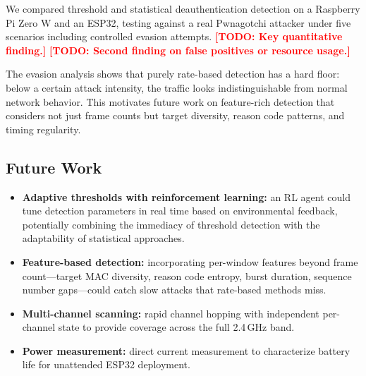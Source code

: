 \documentclass[conference]{IEEEtran}
\newcommand{\placeholder}[1]{\textcolor{red}{\textbf{[TODO: #1]}}}
\begin{document}
We compared threshold and statistical deauthentication detection on a Raspberry Pi Zero W and an ESP32, testing against a real Pwnagotchi attacker under five scenarios including controlled evasion attempts. \placeholder{Key quantitative finding.} \placeholder{Second finding on false positives or resource usage.}

The evasion analysis shows that purely rate-based detection has a hard floor: below a certain attack intensity, the traffic looks indistinguishable from normal network behavior. This motivates future work on feature-rich detection that considers not just frame counts but target diversity, reason code patterns, and timing regularity.

\subsection{Future Work}

\begin{itemize}
    \item \textbf{Adaptive thresholds with reinforcement learning:} an RL agent could tune detection parameters in real time based on environmental feedback, potentially combining the immediacy of threshold detection with the adaptability of statistical approaches.
    \item \textbf{Feature-based detection:} incorporating per-window features beyond frame count---target MAC diversity, reason code entropy, burst duration, sequence number gaps---could catch slow attacks that rate-based methods miss.
    \item \textbf{Multi-channel scanning:} rapid channel hopping with independent per-channel state to provide coverage across the full 2.4\,GHz band.
    \item \textbf{Power measurement:} direct current measurement to characterize battery life for unattended ESP32 deployment.
\end{itemize}



\end{document}
